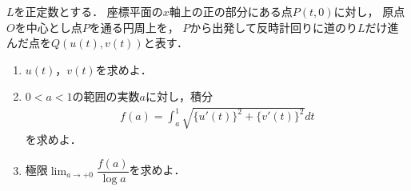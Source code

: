 \documentclass[../../main.tex]{subfiles}
\begin{document}
$L$を正定数とする．
座標平面の$x$軸上の正の部分にある点$P(t,0)$に対し，
原点$O$を中心とし点$P$を通る円周上を，
$P$から出発して反時計回りに道のり$L$だけ進んだ点を$Q(u(t),v(t))$と表す．
\begin{enumerate}
  \item $u(t)$，$v(t)$を求めよ．
  \item $0<a<1$の範囲の実数$a$に対し，積分
    \begin{align*}
      f(a) = \int_a^1 \sqrt{ {\{u'(t)\}}^2+{\{v'(t)\}}^2 } dt
    \end{align*}
    を求めよ．
  \item 極限$\displaystyle\lim_{a\to+0}\dfrac{f(a)}{\log a}$を求めよ．
\end{enumerate}
\end{document}
